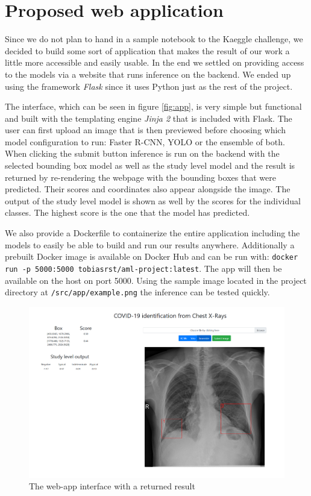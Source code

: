 \chapter{Proposed web application}\label{chapter:webapp}

Since we do not plan to hand in a sample notebook to the Kaeggle challenge, we decided to build some sort of application that makes the result of our work a little more accessible and easily usable. In the end we settled on providing access to the models via a website that runs inference on the backend. We ended up using the framework \textit{Flask} \autocite{ronacher_flask_nodate} since it uses Python just as the rest of the project.

The interface, which can be seen in figure \vref{fig:app}, is very simple but functional and built with the templating engine \textit{Jinja 2} that is included with Flask. The user can first upload an image that is then previewed before choosing which model configuration to run: Faster \ac{R-CNN}, \ac{YOLO} or the ensemble of both. When clicking the submit button inference is run on the backend with the selected bounding box model as well as the study level model and the result is returned by re-rendering the webpage with the bounding boxes that were predicted. Their scores and coordinates also appear alongside the image. The output of the study level model is shown as well by the scores for the individual classes. The highest score is the one that the model has predicted.

We also provide a Dockerfile to containerize the entire application including the models to easily be able to build and run our results anywhere. Additionally a prebuilt Docker image is available on Docker Hub and can be run with: \texttt{docker run -p 5000:5000 tobiasrst/aml-project:latest}. The app will then be available on the host on port 5000. Using the sample image located in the project directory at \texttt{/src/app/example.png} the inference can be tested quickly.

\begin{figure}[]
	\centering
	\includegraphics[width=0.9\linewidth]{img/app.png}
	\caption{The web-app interface with a returned result}
	\label{fig:app}
\end{figure}